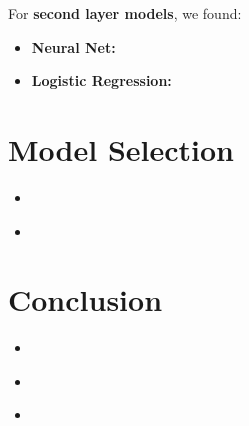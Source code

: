 \begin{itemize}
        For \textbf{second layer models}, we found:
        \begin{itemize}
            \item \textbf{Neural Net:}
            \item \textbf{Logistic Regression:}
        \end{itemize}

\end{itemize}



\section{Model Selection}
\medskip
\begin{itemize}

    \item {} \\

    \item {} \\

\end{itemize}



\section{Conclusion}
\medskip
\begin{itemize}

    \item {} \\

    \item {} \\

    \item {} \\

\end{itemize}




